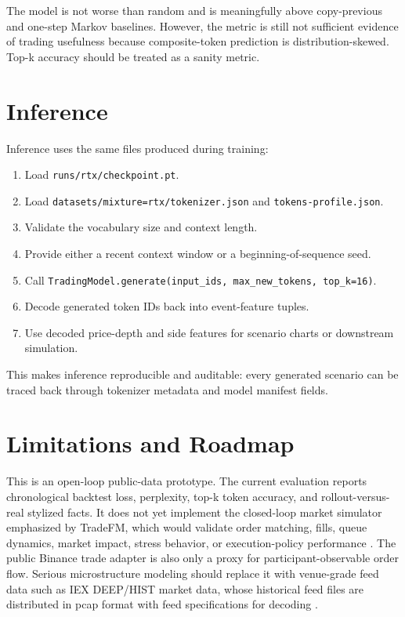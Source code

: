 \documentclass[11pt]{article}
\begin{document}
The model is not worse than random and is meaningfully above copy-previous and
one-step Markov baselines. However, the metric is still not sufficient evidence
of trading usefulness because composite-token prediction is distribution-skewed.
Top-k accuracy should be treated as a sanity metric.

\section{Inference}

Inference uses the same files produced during training:

\begin{enumerate}[leftmargin=1.6em]
  \item Load \texttt{runs/rtx/checkpoint.pt}.
  \item Load \texttt{datasets/mixture=rtx/tokenizer.json} and
  \texttt{tokens-profile.json}.
  \item Validate the vocabulary size and context length.
  \item Provide either a recent context window or a beginning-of-sequence seed.
  \item Call \texttt{TradingModel.generate(input\_ids, max\_new\_tokens,
  top\_k=16)}.
  \item Decode generated token IDs back into event-feature tuples.
  \item Use decoded price-depth and side features for scenario charts or
  downstream simulation.
\end{enumerate}

This makes inference reproducible and auditable: every generated scenario can
be traced back through tokenizer metadata and model manifest fields.

\section{Limitations and Roadmap}

This is an open-loop public-data prototype. The current evaluation reports
chronological backtest loss, perplexity, top-k token accuracy, and
rollout-versus-real stylized facts. It does not yet implement the closed-loop
market simulator emphasized by TradeFM, which would validate order matching,
fills, queue dynamics, market impact, stress behavior, or execution-policy
performance \cite{tradefm}. The public Binance trade adapter is also only a
proxy for participant-observable order flow. Serious microstructure modeling
should replace it with venue-grade feed data such as IEX DEEP/HIST market data,
whose historical feed files are distributed in pcap format with feed
specifications for decoding \cite{iexmarketdata}.
\end{document}
